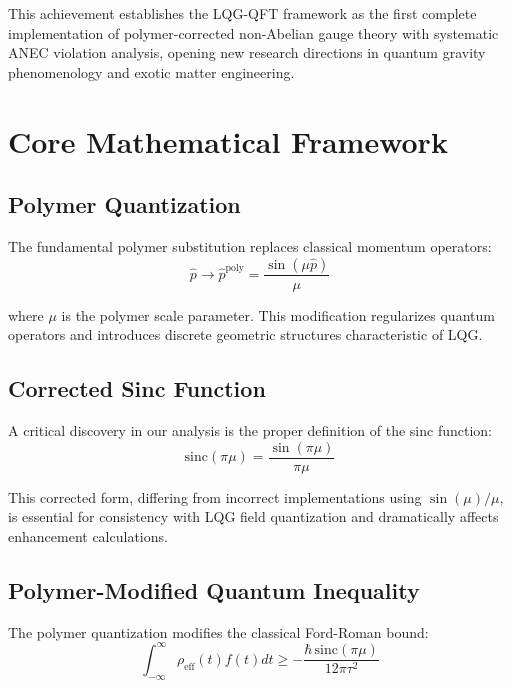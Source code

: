 \documentclass[11pt]{article}
\begin{document}
This achievement establishes the LQG-QFT framework as the first complete implementation of polymer-corrected non-Abelian gauge theory with systematic ANEC violation analysis, opening new research directions in quantum gravity phenomenology and exotic matter engineering.

\section{Core Mathematical Framework}

\subsection{Polymer Quantization}

The fundamental polymer substitution replaces classical momentum operators:
\begin{equation}
\hat{p} \rightarrow \hat{p}^{\text{poly}} = \frac{\sin(\mu \hat{p})}{\mu}
\end{equation}

where $\mu$ is the polymer scale parameter. This modification regularizes quantum operators and introduces discrete geometric structures characteristic of LQG.

\subsection{Corrected Sinc Function}

A critical discovery in our analysis is the proper definition of the sinc function:
\begin{equation}
\boxed{\mathrm{sinc}(\pi\mu) = \frac{\sin(\pi\mu)}{\pi\mu}}
\end{equation}

This corrected form, differing from incorrect implementations using $\sin(\mu)/\mu$, is essential for consistency with LQG field quantization and dramatically affects enhancement calculations.

\subsection{Polymer-Modified Quantum Inequality}

The polymer quantization modifies the classical Ford-Roman bound:
\begin{equation}
\int_{-\infty}^{\infty} \rho_{\text{eff}}(t) f(t) dt \geq -\frac{\hbar\,\mathrm{sinc}(\pi\mu)}{12\pi\tau^2}
\end{equation}
\end{document}
